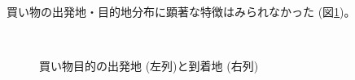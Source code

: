 \documentclass[a4paper,12pt, uplatex]{jsbook}
\begin{document}
買い物の出発地・目的地分布に顕著な特徴はみられなかった (図\ref{fig:od_shopping_remote})。
%
\begin{figure}[htbp]
  \centering
  \\%
    \caption{買い物目的の出発地 (左列)と到着地 (右列)}
  	\label{fig:od_shopping_remote}
\end{figure}
\end{document}
